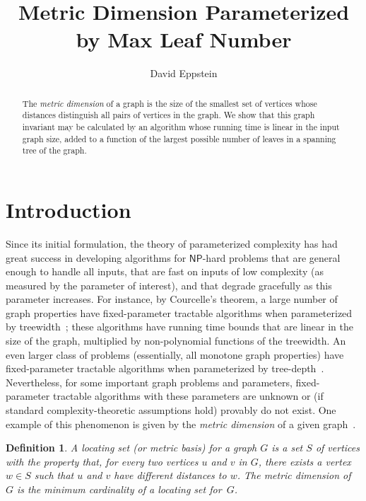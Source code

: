 \documentclass{jgaa-art}
\title{Metric Dimension Parameterized\\ by Max Leaf Number}
\author{David Eppstein}{eppstein@uci.edu}
\affiliation{Department of Computer Science, University of California, Irvine}
\newtheorem{definition}{Definition}
\begin{document}
\maketitle

\begin{abstract}
The \emph{metric dimension} of a graph is the size of the smallest set of vertices whose distances distinguish all pairs of vertices in the graph. We show that this graph invariant may be calculated by an algorithm whose running time is linear in the input graph size, added to a function of the largest possible number of leaves in a spanning tree of the graph.
\end{abstract}

\section{Introduction}

Since its initial formulation, the theory of parameterized complexity has had great success in developing algorithms for $\mathsf{NP}$-hard problems that are general enough to handle all inputs, that are fast on inputs of low complexity (as measured by the parameter of interest), and that degrade gracefully as this parameter increases. For instance, by Courcelle's theorem, a large number of graph properties have fixed-parameter tractable algorithms when parameterized by treewidth~\cite{Cou-IC-90}; these algorithms have running time bounds that are linear in the size of the graph, multiplied by non-polynomial functions of the treewidth. An even larger class of problems (essentially, all monotone graph properties) have fixed-parameter tractable algorithms when parameterized by tree-depth~\cite{NesOss-12}.
Nevertheless, for some important graph problems and parameters, fixed-parameter tractable algorithms with these parameters are unknown or (if standard complexity-theoretic assumptions hold) provably do not exist.  One example of this phenomenon is given by the \emph{metric dimension} of a given graph~\cite{HarMel-AC-76}.

\begin{definition}
A  \emph{locating set} (or \emph{metric basis}) for a graph $G$ is a set $S$ of vertices with the property that, for every two vertices $u$ and $v$ in $G$, there exists a vertex $w\in S$ such that $u$ and $v$ have different distances to $w$. The \emph{metric dimension} of~$G$ is the minimum cardinality of a locating set for~$G$.
\end{definition}
\end{document}
